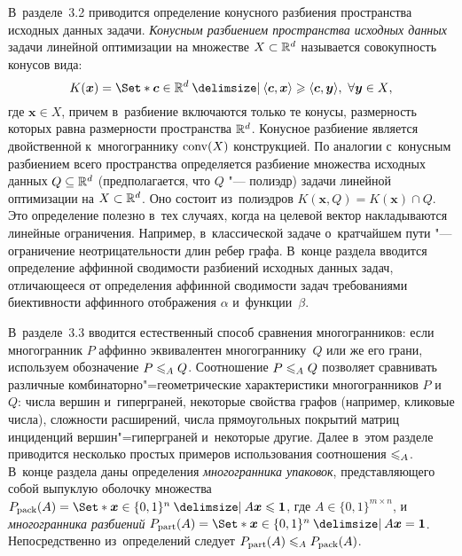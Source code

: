 В~разделе~3.2 приводится 
определение конусного разбиения пространства исходных данных задачи.
\emph{Конусным разбиением пространства исходных данных} задачи линейной оптимизации на множестве $X \subset \mathbb{R}^d$ называется совокупность конусов вида:
\[
K(\bm{x}) = \Set*{\bm{c}\in \R^d \given  \langle\bm{c}, \bm{x}\rangle \ge \langle\bm{c}, \bm{y}\rangle, \ \forall \bm{y} \in X}, 
\]
где $\bm{x} \in X$, причем в~разбиение включаются только те конусы, размерность которых равна размерности пространства $\mathbb{R}^d$.
Конусное разбиение является двойственной к~многограннику $\operatorname{conv}(X)$ конструкцией.
По аналогии с~конусным разбиением всего пространства определяется разбиение множества исходных данных $Q \subseteq \mathbb{R}^d$ (предполагается, что $Q$ "--- полиэдр) задачи линейной оптимизации на $X \subset \mathbb{R}^d$. Оно состоит из~полиэдров $K(\bm{x},Q) = K(\bm{x}) \cap Q$.
Это определение полезно в~тех случаях, когда на целевой вектор накладываются линейные ограничения. Например, в~классической задаче о~кратчайшем пути "--- ограничение неотрицательности длин ребер графа.
В~конце раздела вводится определение аффинной сводимости разбиений исходных данных задач, отличающееся от определения аффинной сводимости задач требованиями биективности аффинного отображения $\alpha$ и~функции~$\beta$.

В~разделе~3.3 вводится естественный способ сравнения многогранников: если многогранник $P$ аффинно эквивалентен многограннику~$Q$ или же его грани, используем обозначение $P \leqslant_A Q$. 
Соотношение $P \leqslant_A Q$ позволяет сравнивать различные комбинаторно"=геометрические характеристики многогранников $P$ и~$Q$: числа вершин и~гиперграней, некоторые свойства графов (например, кликовые числа), сложности расширений, числа прямоугольных покрытий матриц инциденций вершин"=гиперграней и~некоторые другие.
Далее в~этом разделе приводится несколько простых примеров использования соотношения $\leqslant_A$. В~конце раздела даны определения \emph{многогранника упаковок}, представляющего собой выпуклую оболочку множества 
\(\Pack(A) = \Set*{\bm{x}\in\{0,1\}^n \given A \bm{x} \le \bm{1}}\), где $A\in\{0,1\}^{m\times n}$,
и \emph{многогранника разбиений}
\(\Part(A) = \Set*{\bm{x}\in\{0,1\}^n \given A \bm{x} = \bm{1}}\).
Непосредственно из~определений следует \(P_{\textup{part}}(A) \leqslant_A P_{\textup{pack}}(A)\).

